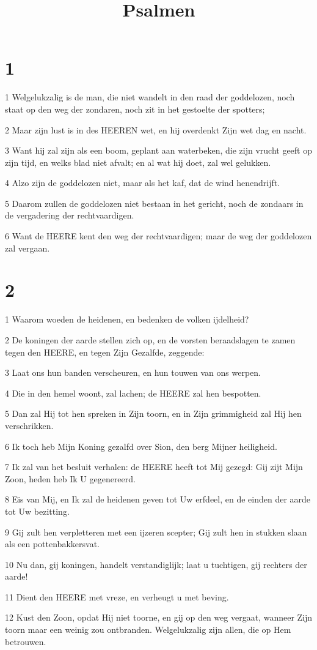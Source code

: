 

\title{Psalmen}



\chapter{1}

\par 1 Welgelukzalig is de man, die niet wandelt in den raad der goddelozen, noch staat op den weg der zondaren, noch zit in het gestoelte der spotters;
\par 2 Maar zijn lust is in des HEEREN wet, en hij overdenkt Zijn wet dag en nacht.
\par 3 Want hij zal zijn als een boom, geplant aan waterbeken, die zijn vrucht geeft op zijn tijd, en welks blad niet afvalt; en al wat hij doet, zal wel gelukken.
\par 4 Alzo zijn de goddelozen niet, maar als het kaf, dat de wind henendrijft.
\par 5 Daarom zullen de goddelozen niet bestaan in het gericht, noch de zondaars in de vergadering der rechtvaardigen.
\par 6 Want de HEERE kent den weg der rechtvaardigen; maar de weg der goddelozen zal vergaan.

\chapter{2}

\par 1 Waarom woeden de heidenen, en bedenken de volken ijdelheid?
\par 2 De koningen der aarde stellen zich op, en de vorsten beraadslagen te zamen tegen den HEERE, en tegen Zijn Gezalfde, zeggende:
\par 3 Laat ons hun banden verscheuren, en hun touwen van ons werpen.
\par 4 Die in den hemel woont, zal lachen; de HEERE zal hen bespotten.
\par 5 Dan zal Hij tot hen spreken in Zijn toorn, en in Zijn grimmigheid zal Hij hen verschrikken.
\par 6 Ik toch heb Mijn Koning gezalfd over Sion, den berg Mijner heiligheid.
\par 7 Ik zal van het besluit verhalen: de HEERE heeft tot Mij gezegd: Gij zijt Mijn Zoon, heden heb Ik U gegenereerd.
\par 8 Eis van Mij, en Ik zal de heidenen geven tot Uw erfdeel, en de einden der aarde tot Uw bezitting.
\par 9 Gij zult hen verpletteren met een ijzeren scepter; Gij zult hen in stukken slaan als een pottenbakkersvat.
\par 10 Nu dan, gij koningen, handelt verstandiglijk; laat u tuchtigen, gij rechters der aarde!
\par 11 Dient den HEERE met vreze, en verheugt u met beving.
\par 12 Kust den Zoon, opdat Hij niet toorne, en gij op den weg vergaat, wanneer Zijn toorn maar een weinig zou ontbranden. Welgelukzalig zijn allen, die op Hem betrouwen.

